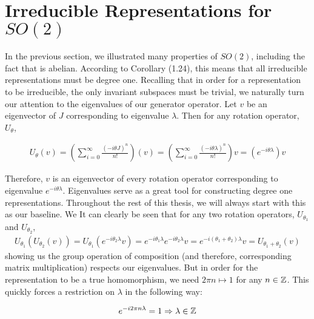\section{Irreducible Representations for $SO(2)$}

In the previous section, we illustrated many properties of $SO(2)$, including the fact that is abelian. According to Corollary (1.24), this means that all irreducible representations must be degree one. Recalling that in order for a representation to be irreducible, the only invariant subspaces must be trivial, we naturally turn our attention to the eigenvalues of our generator operator. Let $v$ be an eigenvector of $J$ corresponding to eigenvalue $\lambda$. Then for any rotation operator, $U_\theta$,


\begin{equation}
	\begin{aligned}
		U_\theta (v) = \left(\sum_{i=0}^\infty \frac{(-i\theta J)^n}{n!}\right) (v) = \left(\sum_{i=0}^\infty \frac{(-i\theta \lambda)^n}{n!}\right)v = \left(e^{-i\theta \lambda}\right)v
	\end{aligned}
\end{equation}

Therefore, $v$ is an eigenvector of every rotation operator corresponding to eigenvalue $e^{-i\theta \lambda}$. Eigenvalues serve as a great tool for constructing degree one representations. Throughout the rest of this thesis, we will always start with this as our baseline.
We 
It can clearly be seen that for any two rotation operators, $U_{\theta_1}$ and $U_{\theta_2}$,  
\begin{equation}
	\begin{aligned}
		U_{\theta_1}(U_{\theta_2}(v)) = U_{\theta_1}(e^{-i\theta_2 \lambda}v) = e^{-i\theta_1 \lambda}e^{-i\theta_2 \lambda}v = e^{-i(\theta_1 + \theta_2) \lambda}v = U_{\theta_1+\theta_2}(v) 
	\end{aligned}
\end{equation}
showing us the group operation of composition (and therefore, corresponding matrix multiplication) respects our eigenvalues. But in order for the representation to be a true homomorphism, we need $2\pi n \mapsto 1$ for any $n\in\mathbb{Z}$. This quickly forces a restriction on $\lambda$ in the following way:

\begin{equation}
	\begin{aligned}
		e^{-i2\pi n\lambda} = 1 \Rightarrow \lambda \in \mathbb{Z}
	\end{aligned}
\end{equation}

